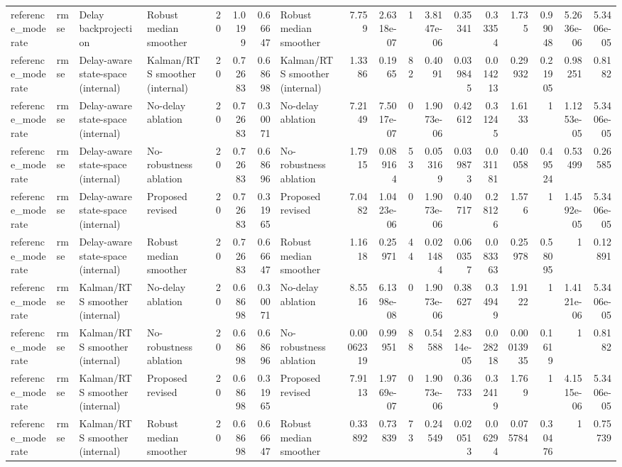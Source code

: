 \begin{table}[!htbp]
{\begin{tabular}{llllrrrlrrrrrrrrrr}
reference_moderate & rmse & Delay backprojection & Robust median smoother & 20 & 1.0199 & 0.66647 & Robust median smoother & 7.759 & 2.6318e-07 & 1 & 3.8147e-06 & 0.35341 & 0.33354 & 1.735 & 0.99048 & 5.2636e-06 & 5.3406e-05 \\
reference_moderate & rmse & Delay-aware state-space (internal) & Kalman/RTS smoother (internal) & 20 & 0.72683 & 0.68698 & Kalman/RTS smoother (internal) & 1.3386 & 0.1965 & 82 & 0.4091 & 0.039845 & 0.014213 & 0.29932 & 0.21905 & 0.98251 & 0.8182 \\
reference_moderate & rmse & Delay-aware state-space (internal) & No-delay ablation & 20 & 0.72683 & 0.30071 & No-delay ablation & 7.2149 & 7.5017e-07 & 0 & 1.9073e-06 & 0.42612 & 0.31245 & 1.6133 & 1 & 1.1253e-05 & 5.3406e-05 \\
reference_moderate & rmse & Delay-aware state-space (internal) & No-robustness ablation & 20 & 0.72683 & 0.68696 & No-robustness ablation & 1.7915 & 0.089164 & 53 & 0.053169 & 0.039873 & 0.031181 & 0.40058 & 0.49524 & 0.53499 & 0.26585 \\
reference_moderate & rmse & Delay-aware state-space (internal) & Proposed revised & 20 & 0.72683 & 0.31965 & Proposed revised & 7.0482 & 1.0423e-06 & 0 & 1.9073e-06 & 0.40717 & 0.28126 & 1.576 & 1 & 1.4592e-05 & 5.3406e-05 \\
reference_moderate & rmse & Delay-aware state-space (internal) & Robust median smoother & 20 & 0.72683 & 0.66647 & Robust median smoother & 1.1618 & 0.25971 & 44 & 0.021484 & 0.060357 & 0.083363 & 0.25978 & 0.58095 & 1 & 0.12891 \\
reference_moderate & rmse & Kalman/RTS smoother (internal) & No-delay ablation & 20 & 0.68698 & 0.30071 & No-delay ablation & 8.5516 & 6.1398e-08 & 0 & 1.9073e-06 & 0.38627 & 0.34949 & 1.9122 & 1 & 1.4121e-06 & 5.3406e-05 \\
reference_moderate & rmse & Kalman/RTS smoother (internal) & No-robustness ablation & 20 & 0.68698 & 0.68696 & No-robustness ablation & 0.00062319 & 0.99951 & 88 & 0.54588 & 2.8314e-05 & 0.028218 & 0.00013935 & 0.1619 & 1 & 0.8182 \\
reference_moderate & rmse & Kalman/RTS smoother (internal) & Proposed revised & 20 & 0.68698 & 0.31965 & Proposed revised & 7.9113 & 1.9769e-07 & 0 & 1.9073e-06 & 0.36733 & 0.32419 & 1.769 & 1 & 4.1515e-06 & 5.3406e-05 \\
reference_moderate & rmse & Kalman/RTS smoother (internal) & Robust median smoother & 20 & 0.68698 & 0.66647 & Robust median smoother & 0.33892 & 0.73839 & 73 & 0.24549 & 0.020513 & 0.06294 & 0.075784 & 0.30476 & 1 & 0.75739 \\

\end{tabular}}
\end{table}
